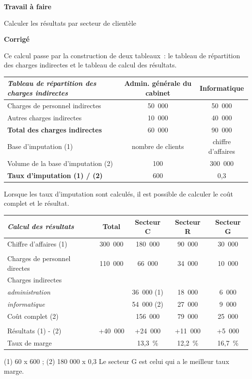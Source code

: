 \documentclass[oneside]{kaobook}
\begin{document}
\textbf{Travail à faire}

Calculer les résultats par secteur de clientèle

\textbf{Corrigé}

Ce calcul passe par la construction de deux tableaux : le tableau de répartition des charges indirectes et le tableau de calcul des résultats.
\begin{center}
\footnotesize
\begin{tabular}{l c c}
\emph{Tableau de répartition des charges indirectes} & Admin. générale du cabinet & Informatique\\
\hline
Charges de personnel indirectes & 50 000 & 50 000\\
Autres charges indirectes & 10 000 & 40 000\\
\textbf{Total des charges indirectes} & 60 000 & 90 000\\
Base d'imputation (1) & nombre de clients & chiffre d'affaires\\
Volume de la base d'imputation (2) & 100 & 300 000\\
\textbf{Taux d'imputation (1) / (2)} & 600 & 0,3\\
\end{tabular}
\end{center}

Lorsque les taux d'imputation sont calculés, il est possible de calculer le coût complet et le résultat.
\begin{center}
\footnotesize
\begin{tabular}{l c c c c}
\emph{Calcul des résultats} & Total & Secteur C & Secteur R & Secteur G\\
\hline
Chiffre d'affaires (1) & 300 000 & 180 000 & 90 000 & 30 000\\
 &  &  &  & \\
Charges de personnel directes & 110 000 & 66 000 & 34 000 & 10 000\\
Charges indirectes &  &  &  & \\
\emph{administration} &  & 36 000 (1) & 18 000 & 6 000\\
\emph{informatique} &  & 54 000 (2) & 27 000 & 9 000\\
Coût complet (2) &  & 156 000 & 79 000 & 25 000\\
 &  &  &  & \\
Résultats (1) - (2) & +40 000 & +24 000 & +11 000 & +5 000\\
Taux de marge &  & 13,3 \% & 12,2 \% & 16,7 \%\\
\end{tabular}
\end{center}
(1) 60 x 600 ; (2) 180 000 x 0,3
Le secteur G est celui qui a le meilleur taux marge.
\end{document}
